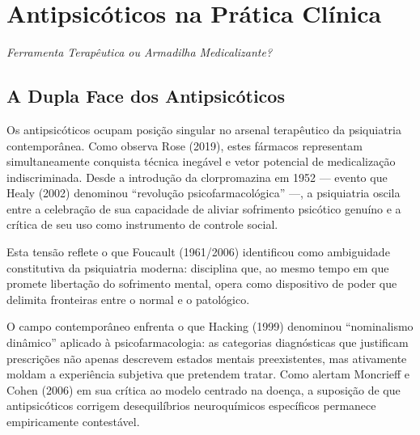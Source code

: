 \chapter{Antipsicóticos na Prática Clínica}
\label{ch:antipsicoticos}

\begin{flushright}
\textit{Ferramenta Terapêutica ou Armadilha Medicalizante?}
\end{flushright}

\vspace{1em}

\section{A Dupla Face dos Antipsicóticos}
\label{sec:dupla-face}

Os antipsicóticos ocupam posição singular no arsenal terapêutico da psiquiatria contemporânea. Como observa Rose (2019), estes fármacos representam simultaneamente conquista técnica inegável e vetor potencial de medicalização indiscriminada. Desde a introdução da clorpromazina em 1952 --- evento que Healy (2002) denominou \enquote{revolução psicofarmacológica} ---, a psiquiatria oscila entre a celebração de sua capacidade de aliviar sofrimento psicótico genuíno e a crítica de seu uso como instrumento de controle social.

Esta tensão reflete o que Foucault (1961/2006) identificou como ambiguidade constitutiva da psiquiatria moderna: disciplina que, ao mesmo tempo em que promete libertação do sofrimento mental, opera como dispositivo de poder que delimita fronteiras entre o normal e o patológico.

O campo contemporâneo enfrenta o que Hacking (1999) denominou \enquote{nominalismo dinâmico} aplicado à psicofarmacologia: as categorias diagnósticas que justificam prescrições não apenas descrevem estados mentais preexistentes, mas ativamente moldam a experiência subjetiva que pretendem tratar. Como alertam Moncrieff e Cohen (2006) em sua crítica ao modelo centrado na doença, a suposição de que antipsicóticos corrigem desequilíbrios neuroquímicos específicos permanece empiricamente contestável.

